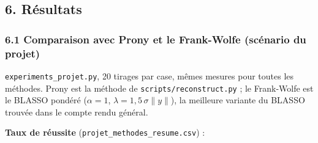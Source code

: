 \documentclass[
  french,
]{article}
\begin{document}
\subsection{6. Résultats}\label{ruxe9sultats}

\subsubsection{6.1 Comparaison avec Prony et le Frank-Wolfe (scénario du
projet)}\label{comparaison-avec-prony-et-le-frank-wolfe-scuxe9nario-du-projet}

\texttt{experiments\_projet.py}, 20 tirages par case, mêmes mesures pour
toutes les méthodes. Prony est la méthode de
\texttt{scripts/reconstruct.py} ; le Frank-Wolfe est le BLASSO pondéré
(\(\alpha = 1\), \(\lambda = 1{,}5\,\sigma\lVert y\rVert\)), la
meilleure variante du BLASSO trouvée dans le compte rendu général.

\textbf{Taux de réussite} (\texttt{projet\_methodes\_resume.csv}) :
\end{document}

